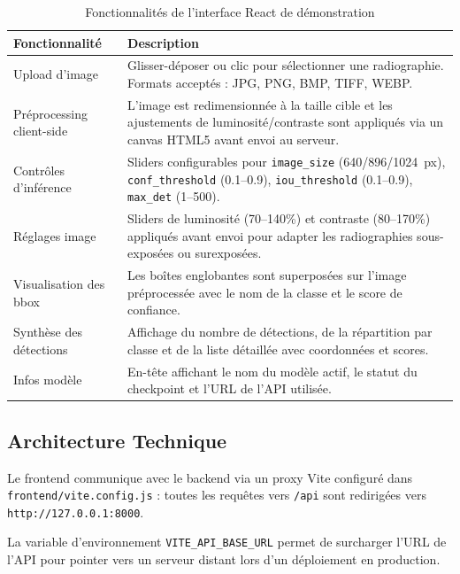 \documentclass{rapportENSIAS}
\newcommand{\projectpath}[1]{\texttt{#1}}
\begin{document}
\begin{table}[H]
\centering
\caption{Fonctionnalités de l'interface React de démonstration}
\label{tab:frontend_features}
\begin{tabular}{p{4cm} p{10cm}}
\toprule
\textbf{Fonctionnalité} & \textbf{Description} \\
\midrule
Upload d'image
  & Glisser-déposer ou clic pour sélectionner une radiographie.
    Formats acceptés : JPG, PNG, BMP, TIFF, WEBP. \\
\midrule
Préprocessing client-side
  & L'image est redimensionnée à la taille cible et les ajustements de
    luminosité/contraste sont appliqués via un canvas HTML5 avant envoi
    au serveur. \\
\midrule
Contrôles d'inférence
  & Sliders configurables pour \texttt{image\_size} (640/896/1024~px),
    \texttt{conf\_threshold} (0.1--0.9), \texttt{iou\_threshold} (0.1--0.9),
    \texttt{max\_det} (1--500). \\
\midrule
Réglages image
  & Sliders de luminosité (70--140\%) et contraste (80--170\%)
    appliqués avant envoi pour adapter les radiographies
    sous-exposées ou surexposées. \\
\midrule
Visualisation des bbox
  & Les boîtes englobantes sont superposées sur l'image préprocessée
    avec le nom de la classe et le score de confiance. \\
\midrule
Synthèse des détections
  & Affichage du nombre de détections, de la répartition par classe
    et de la liste détaillée avec coordonnées et scores. \\
\midrule
Infos modèle
  & En-tête affichant le nom du modèle actif, le statut du checkpoint
    et l'URL de l'API utilisée. \\
\bottomrule
\end{tabular}
\end{table}

\subsection{Architecture Technique}

Le frontend communique avec le backend via un proxy Vite configuré dans
\projectpath{frontend/vite.config.js} : toutes les requêtes vers \texttt{/api}
sont redirigées vers \texttt{http://127.0.0.1:8000}.

La variable d'environnement \texttt{VITE\_API\_BASE\_URL} permet de surcharger
l'URL de l'API pour pointer vers un serveur distant lors d'un déploiement
en production.
\end{document}
